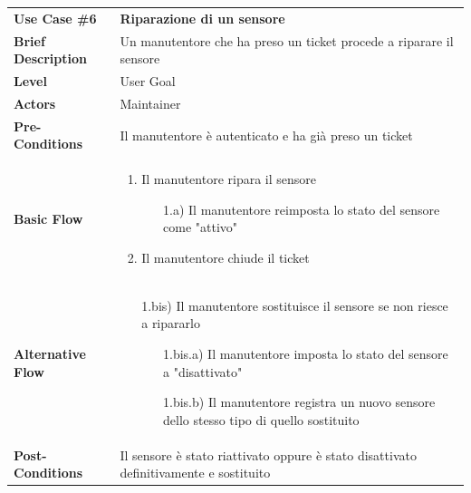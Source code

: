 \documentclass[a4paper, 11pt]{article}
\begin{document}
	\begin{table}[h]
		\centering
		\setlength{\arrayrulewidth}{0.8pt} %

		\begin{tabular}{|l p{12cm}|}
			\hline

			\rowcolor{gray!25}
			\textbf{Use Case \#6} & \textbf{Riparazione di un sensore} \\
			\textbf{Brief Description} & Un manutentore che ha preso un ticket procede a riparare il sensore \\
			\textbf{Level} & User Goal \\
			\textbf{Actors} & Maintainer \\
			\textbf{Pre-Conditions} & Il manutentore è autenticato e ha già preso un ticket \\
			\textbf{Basic Flow} & \begin{enumerate}[label=\arabic*), leftmargin=*, before=\vspace{-0.7cm}, after=\vspace{-0.4cm}]
									  \item Il manutentore ripara il sensore
									  \begin{enumerate}[label=\arabic*), leftmargin=*, before=\vspace{-0.3cm}, after=\vspace{-0.3cm}]
										  \item[1.a)] Il manutentore reimposta lo stato del sensore come "attivo"
									  \end{enumerate}
									  \item Il manutentore chiude il ticket
									  \item[]
			\end{enumerate} \\
			\textbf{Alternative Flow} & \begin{enumerate}[label=\arabic*), before=\vspace{-0.7cm}, after=\vspace{-0.4cm}]
											\item[1.bis)] Il manutentore sostituisce il sensore se non riesce a ripararlo
											\begin{enumerate}[label=\arabic*), leftmargin=*, before=\vspace{-0.3cm}, after=\vspace{-0.3cm}]
												\item[1.bis.a)] Il manutentore imposta lo stato del sensore a "disattivato"
												\item[1.bis.b)] Il manutentore registra un nuovo sensore dello stesso tipo di quello sostituito
												\item[]
											\end{enumerate}
			\end{enumerate} \\
			\textbf{Post-Conditions} & Il sensore è stato riattivato oppure è stato disattivato definitivamente e sostituito\\


\end{tabular}
\end{table}
\end{document}
